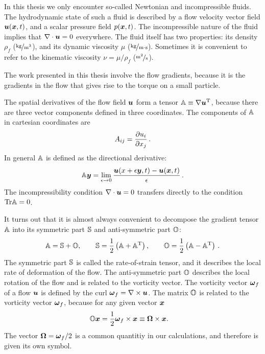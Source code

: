 \documentclass[thesis.tex]{subfiles}
\begin{document}
In this thesis we only encounter so-called Newtonian and incompressible fluids. The hydrodynamic state of such a fluid is described by a flow velocity vector field $\mbox{\boldmath$u$}(\mbox{\boldmath$x$},t)$, and a scalar pressure field $p(\mbox{\boldmath$x$}, t)$. The incompressible nature of the fluid implies that $\nabla \cdot \mbox{\boldmath$u$} = 0$ everywhere.
The fluid itself has two properties: its density $\rho_f$ ($\unitfrac{kg}{m^3}$), and its dynamic viscosity $\mu$ ($\unitfrac{kg}{m\cdot s}$). Sometimes it is convenient to refer to the kinematic viscosity $\nu = \mu / \rho_f$ ($\unitfrac{m^2}{s}$).

The work presented in this thesis involve the flow gradients, because it is the gradients in the flow that gives rise to the torque on a small particle.

The spatial derivatives of the flow field $\mbox{\boldmath$u$}$ form a tensor $\mathbb{A} \equiv \nabla \mbox{\boldmath$u$}^{\mathrm T}$, because there are three vector components defined in three coordinates. The components of $\mathbb{A}$ in cartesian coordinates are
\begin{align}
A_{ij}=\frac{\partial u_i}{\partial x_j}\,.	
\end{align}
In general $\mathbb{A}$ is defined as the directional derivative:
\begin{align}
 	\mathbb{A}\mbox{\boldmath$y$} = \lim_{\epsilon\to 0}\frac{\mbox{\boldmath$u$}(x+\epsilon \mbox{\boldmath$y$},t)-\mbox{\boldmath$u$}(\mbox{\boldmath$x$}, t)}{\epsilon}\,.
\end{align}
The incompressibility condition $\nabla\cdot\mbox{\boldmath$u$}=0$ transfers directly to the condition $\mbox{Tr} \mathbb{A}=0$.

It turns out that it is almost always convenient to decompose the gradient tensor $\mathbb{A}$ into its symmetric part $\mathbb{S}$ and anti-symmetric  part $\mathbb{O}$:
\begin{align}
	\mathbb{A} = \mathbb{S} + \mathbb{O},\qquad
	\mathbb{S} = \frac{1}{2}\left(\mathbb{A} + \mathbb{A}^{\mathrm T}\right),\qquad
	\mathbb{O} = \frac{1}{2}\left(\mathbb{A} - \mathbb{A}^{\mathrm T}\right)\,.
\end{align}
The symmetric part $\mathbb{S}$ is called the rate-of-strain tensor, and it describes the local rate of deformation of the flow. The anti-symmetric part $\mathbb{O}$ describes the local rotation of the flow and is related to the vorticity vector. The vorticity vector $\mbox{\boldmath$\omega$}_f$ of a flow $\mbox{\boldmath$u$}$ is defined by the curl $\mbox{\boldmath$\omega$}_f = \nabla \times \mbox{\boldmath$u$}$. The matrix $\mathbb{O}$ is related to the vorticity vector $\mbox{\boldmath$\omega$}_f$, because for any given vector $\mbox{\boldmath$x$}$
\begin{align}
	\ma O \ve x &= \frac{1}{2}\ve \omega_f \cross \ve x \equiv \ve \Omega \cross \ve x.\eqnlab{vorticityOdef}
\end{align}
The vector $\mbox{\boldmath$\Omega$}=\mbox{\boldmath$\omega$}_f/2$ is a common quantitiy in our calculations, and therefore is given its own symbol.
\end{document}
